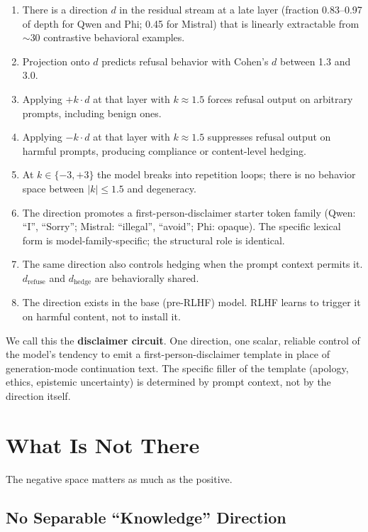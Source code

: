 \documentclass[11pt,a4paper]{article}
\begin{document}
\begin{enumerate}
\item There is a direction $d$ in the residual stream at a late layer (fraction 0.83--0.97 of depth for Qwen and Phi; 0.45 for Mistral) that is linearly extractable from $\sim$30 contrastive behavioral examples.
\item Projection onto $d$ predicts refusal behavior with Cohen's $d$ between 1.3 and 3.0.
\item Applying $+k \cdot d$ at that layer with $k \approx 1.5$ forces refusal output on arbitrary prompts, including benign ones.
\item Applying $-k \cdot d$ at that layer with $k \approx 1.5$ suppresses refusal output on harmful prompts, producing compliance or content-level hedging.
\item At $k \in \{-3, +3\}$ the model breaks into repetition loops; there is no behavior space between $|k| \leq 1.5$ and degeneracy.
\item The direction promotes a first-person-disclaimer starter token family (Qwen: ``I'', ``Sorry''; Mistral: ``illegal'', ``avoid''; Phi: opaque). The specific lexical form is model-family-specific; the structural role is identical.
\item The same direction also controls hedging when the prompt context permits it. $d_{\text{refuse}}$ and $d_{\text{hedge}}$ are behaviorally shared.
\item The direction exists in the base (pre-RLHF) model. RLHF learns to trigger it on harmful content, not to install it.
\end{enumerate}

We call this the \textbf{disclaimer circuit}. One direction, one scalar, reliable control of the model's tendency to emit a first-person-disclaimer template in place of generation-mode continuation text. The specific filler of the template (apology, ethics, epistemic uncertainty) is determined by prompt context, not by the direction itself.

\section{What Is Not There}

The negative space matters as much as the positive.

\subsection{No Separable ``Knowledge'' Direction}
\end{document}
